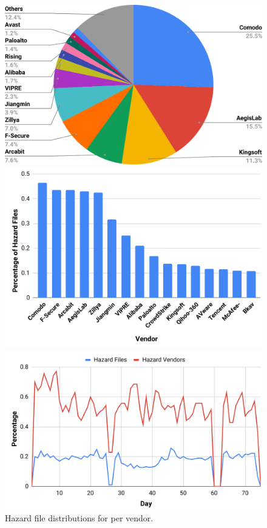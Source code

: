 \begin{figure}[!htb]
  \includegraphics[width=\linewidth]{figure/hazard_vendorAll}
  \caption{Hazard distributions for vendors.
}
\label{fig:hazard_vendorAll}
\endminipage\hfill
{}
  \includegraphics[width=\linewidth]{figure/hazard_vendorFile}
 \caption{Hazard file distributions for per vendor.
}
\label{fig:hazard_vendorFile}
\endminipage\hfill
{}%
  \includegraphics[width=\linewidth]{figure/hazard_day}

\end{figure}
